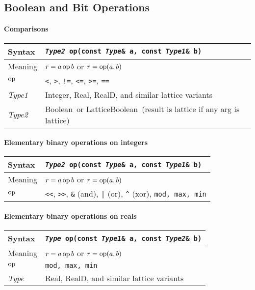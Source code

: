 \documentclass[12pt,letterpaper]{article}
\newcommand{\op}{\mathop{\rm op}}
\newcommand{\tLatticeBoolean}{LatticeBoolean}
\newcommand{\tReal}{Real}
\newcommand{\tInt}{Integer}
\newcommand{\tBoolean}{Boolean}
\newcommand{\tRealD}{RealD}
\newcommand{\itt}{\it Type}
\newcommand{\protoBinaryQual}[1]{{\tt {\it Type} #1(const {\it Type1}\& a, const {\it Type2}\& b)}}
\newcommand{\protoBoolBinaryQual}[1]{{\tt {\it Type2} #1(const {\it Type}\& a, const {\it Type1}\& b)}}
\begin{document}
\subsection{Boolean and Bit Operations}
\paragraph{Comparisons}

\begin{flushleft}
  \begin{tabular}{|l|l|}
  \hline 
  Syntax      & \protoBoolBinaryQual{op} \\
  \hline
  Meaning     & $r = a \op b$ or $r = \op(a,b)$ \\
  \hline
  $\op$       & \verb|<|, \verb|>|, \verb|!=|, \verb|<=|, \verb|>=|, \verb|==| \\
  \hline
  {\it Type1} & \tInt, \tReal, \tRealD, and similar lattice variants \\
  {\it Type2} & \tBoolean\ or \tLatticeBoolean\ (result is lattice if any arg is lattice)\\
  \hline
  \end{tabular}
\end{flushleft}

\paragraph{Elementary binary operations on integers}

\begin{flushleft}
  \begin{tabular}{|l|l|}
  \hline 
  Syntax      & \protoBoolBinaryQual{op} \\
  \hline
  Meaning     & $r = a \op b$ or $r = \op(a,b)$\\
  \hline
  $\op$       & \verb|<<|, \verb|>>|, \verb|&| (and), {\tt |} (or), \verb|^| (xor), 
                {\tt mod, max, min} \\
  \hline
  \end{tabular}
\end{flushleft}

\paragraph{Elementary binary operations on reals}

\begin{flushleft}
  \begin{tabular}{|l|l|}
  \hline
  Syntax      & \protoBinaryQual{op} \\
  \hline
  Meaning     & $r = a \op b$ or $r = \op(a,b)$ \\
  \hline
  $\op$       & {\tt mod, max, min} \\
  \hline
  \itt        & \tReal, \tRealD, and similar lattice variants \\
  \hline
  \end{tabular}
\end{flushleft}
\end{document}
